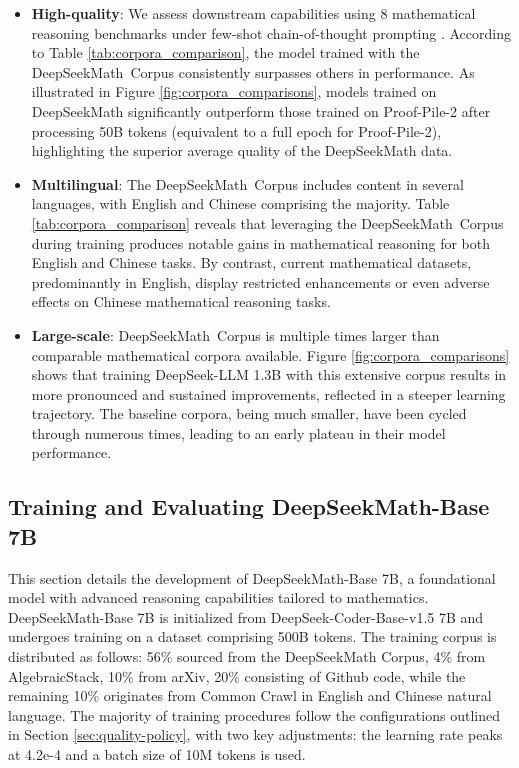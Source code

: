 \begin{itemize}[topsep=0pt]
    \item \textbf{High-quality}:
    We assess downstream capabilities using 8 mathematical reasoning benchmarks under few-shot chain-of-thought prompting \cite{cot}. According to Table \ref{tab:corpora_comparison}, the model trained with the DeepSeekMath~Corpus consistently surpasses others in performance. As illustrated in Figure \ref{fig:corpora_comparisons}, models trained on DeepSeekMath significantly outperform those trained on Proof-Pile-2 after processing 50B tokens (equivalent to a full epoch for Proof-Pile-2), highlighting the superior average quality of the DeepSeekMath data.
    \item \textbf{Multilingual}:
    The DeepSeekMath~Corpus includes content in several languages, with English and Chinese comprising the majority. Table \ref{tab:corpora_comparison} reveals that leveraging the DeepSeekMath~Corpus during training produces notable gains in mathematical reasoning for both English and Chinese tasks. By contrast, current mathematical datasets, predominantly in English, display restricted enhancements or even adverse effects on Chinese mathematical reasoning tasks.
    \item \textbf{Large-scale}:
    DeepSeekMath~Corpus is multiple times larger than comparable mathematical corpora available. Figure \ref{fig:corpora_comparisons} shows that training DeepSeek-LLM 1.3B with this extensive corpus results in more pronounced and sustained improvements, reflected in a steeper learning trajectory. The baseline corpora, being much smaller, have been cycled through numerous times, leading to an early plateau in their model performance.
\end{itemize}

\subsection{Training and Evaluating DeepSeekMath-Base 7B}

This section details the development of DeepSeekMath-Base 7B, a foundational model with advanced reasoning capabilities tailored to mathematics. DeepSeekMath-Base 7B is initialized from DeepSeek-Coder-Base-v1.5 7B \citep{deepseek-coder} and undergoes training on a dataset comprising 500B tokens. The training corpus is distributed as follows: 56\% sourced from the DeepSeekMath Corpus, 4\% from AlgebraicStack, 10\% from arXiv, 20\% consisting of Github code, while the remaining 10\% originates from Common Crawl in English and Chinese natural language. The majority of training procedures follow the configurations outlined in Section \ref{sec:quality-policy}, with two key adjustments: the learning rate peaks at 4.2e-4 and a batch size of 10M tokens is used.

